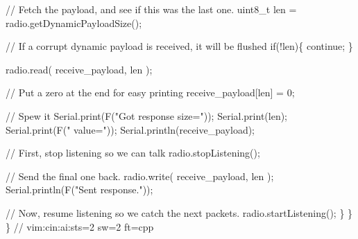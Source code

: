 \begin{DoxyCodeInclude}
      \textcolor{comment}{// Fetch the payload, and see if this was the last one.}
      uint8\_t len = radio.getDynamicPayloadSize();
      
      \textcolor{comment}{// If a corrupt dynamic payload is received, it will be flushed}
      \textcolor{keywordflow}{if}(!len)\{
        \textcolor{keywordflow}{continue}; 
      \}
      
      radio.read( receive\_payload, len );

      \textcolor{comment}{// Put a zero at the end for easy printing}
      receive\_payload[len] = 0;

      \textcolor{comment}{// Spew it}
      Serial.print(F(\textcolor{stringliteral}{"Got response size="}));
      Serial.print(len);
      Serial.print(F(\textcolor{stringliteral}{" value="}));
      Serial.println(receive\_payload);

      \textcolor{comment}{// First, stop listening so we can talk}
      radio.stopListening();

      \textcolor{comment}{// Send the final one back.}
      radio.write( receive\_payload, len );
      Serial.println(F(\textcolor{stringliteral}{"Sent response."}));

      \textcolor{comment}{// Now, resume listening so we catch the next packets.}
      radio.startListening();
    \}
  \}
\}
\textcolor{comment}{// vim:cin:ai:sts=2 sw=2 ft=cpp}
\end{DoxyCodeInclude}
 